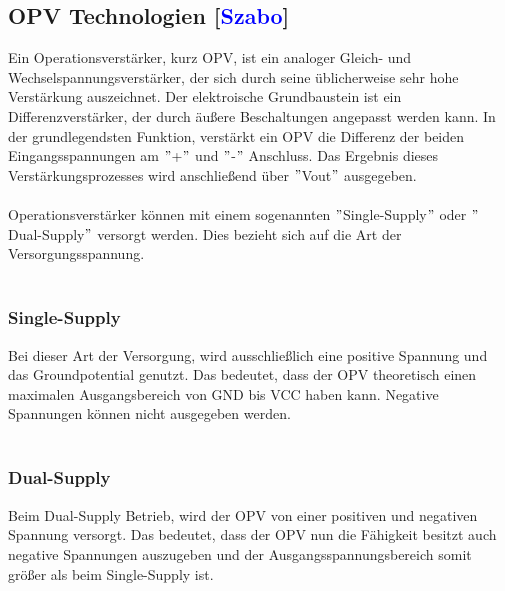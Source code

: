 \documentclass[titlepage,12pt,twoside]{article}
\begin{document}
\subsection{OPV Technologien [\textcolor{blue}{Szabo}]}
\label{chap:OPV Technologien}
Ein Operationsverstärker, kurz OPV, ist ein analoger Gleich- und Wechselspannungsverstärker, der sich durch seine üblicherweise sehr hohe 
Verstärkung auszeichnet. Der elektroische Grundbaustein ist ein Differenzverstärker, der durch äußere Beschaltungen angepasst werden kann.
In der grundlegendsten Funktion, verstärkt ein OPV die Differenz der beiden Eingangsspannungen am $"$+$"$ und $"$-$"$ Anschluss. Das Ergebnis
dieses Verstärkungsprozesses wird anschließend über $"$Vout$"$ ausgegeben. \\
\\
Operationsverstärker können mit einem sogenannten $"$Single-Supply$"$ oder $"$Dual-Supply$"$ versorgt werden. Dies bezieht sich auf
die Art der Versorgungsspannung. \\
\\
\subsubsection{Single-Supply}
Bei dieser Art der Versorgung, wird ausschließlich eine positive Spannung und das Groundpotential genutzt. Das bedeutet, dass der OPV
theoretisch einen maximalen Ausgangsbereich von GND bis VCC haben kann. Negative Spannungen können nicht ausgegeben werden. \\
\\

\subsubsection{Dual-Supply}
Beim Dual-Supply Betrieb, wird der OPV von einer positiven und negativen Spannung versorgt. Das bedeutet, dass der OPV nun die Fähigkeit
besitzt auch negative Spannungen auszugeben und der Ausgangsspannungsbereich somit größer als beim Single-Supply ist.
\end{document}
